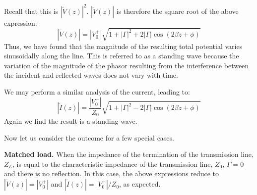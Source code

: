 % 
Recall that this is $|\widetilde{V}(z)|^2$. $|\widetilde{V}(z)|$ is therefore the square root of the above expression:
%
\begin{equation}
\left|\widetilde{V}(z)\right| = |V_0^+| \sqrt{ 1 + \left|\Gamma\right|^2 + 2\left|\Gamma\right| \cos\left( 2\beta z + \phi \right) } 
\end{equation}
%
Thus, we have found that the magnitude of the resulting total potential varies sinusoidally along the line.  
This is referred to as a standing wave because the variation of the magnitude of the phasor resulting from the interference between the incident and reflected waves does not vary with time.

We may perform a similar analysis of the current, leading to:
%
\begin{equation}
\left|\widetilde{I}(z)\right| = \frac{|V_0^+|}{Z_0} \sqrt{ 1 + \left|\Gamma\right|^2 - 2\left|\Gamma\right| \cos\left( 2\beta z + \phi \right) } 
\end{equation}
%
Again we find the result is a standing wave.

Now let us consider the outcome for a few special cases.  

{\bf Matched load.} When the impedance of the termination of the transmission line, $Z_L$, is equal to the characteristic impedance of the transmission line, $Z_0$, $\Gamma=0$ and there is no reflection. In this case, the above expressions reduce to $|\widetilde{V}(z)| = |V_0^+|$ and $|\widetilde{I}(z)| = |V_0^+|/Z_0$, as expected.

